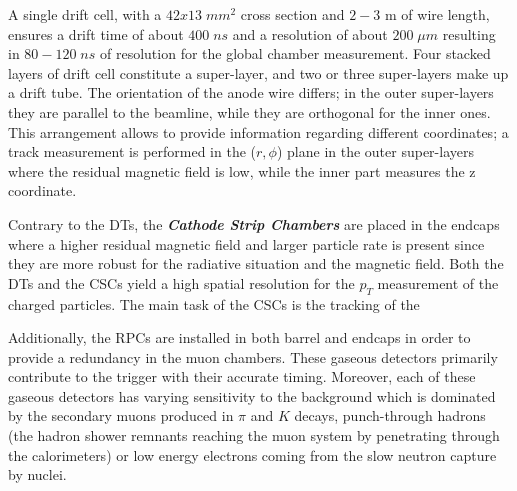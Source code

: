 A single drift cell, with a $42 x 13\; mm^2$ cross section and $2-3$ m of wire length, ensures a drift time of about $400\; ns$ and a resolution of about $200\;\mu m$ resulting in $80-120\;ns$ of resolution for the global chamber measurement. Four stacked layers of drift cell constitute a super-layer, and two or three super-layers make up a drift tube. The orientation of the anode wire differs; in the outer super-layers they are parallel to the beamline, while they are orthogonal for the inner ones. This arrangement allows to provide information regarding different coordinates; a track measurement is performed in the ($r, \phi$) plane in the outer super-layers where the residual magnetic field is low, while the inner part measures the z coordinate.

Contrary to the DTs, the \emph{\textbf{Cathode Strip Chambers}} are placed in the endcaps where a higher residual magnetic field and larger particle rate is present since they are more robust for the radiative situation and the magnetic field. Both the DTs and the CSCs yield a high spatial resolution for the $p_T$ measurement of the charged particles. The main task of the CSCs is the tracking of the 

Additionally, the RPCs are installed in both barrel and endcaps in order to provide a redundancy in the muon chambers. These gaseous detectors primarily contribute to the trigger with their accurate timing. Moreover, each of these gaseous detectors has varying sensitivity to the background which is dominated by the secondary muons produced in $\pi$ and $K$ decays, punch-through hadrons (the hadron shower remnants reaching the muon system by penetrating through the calorimeters) or low energy electrons coming from the slow neutron capture by nuclei.